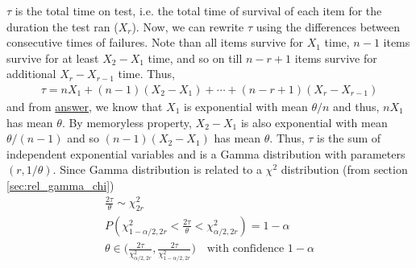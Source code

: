 \documentclass[../probability-notes.tex]{subfiles}
\begin{document}
    $\tau$ is the total time on test, i.e. the total time of survival of each item for the duration the test ran ($X_{r}$). Now, we can rewrite $\tau$ using the differences between consecutive times of failures. Note than all items survive for $X_{1}$ time, $n-1$ items survive for at least $X_{2} - X_{1}$ time, and so on till $n-r+1$ items survive for additional $X_{r} - X_{r-1}$ time. Thus,
    \begin{align*}
        \tau = nX_{1} + (n-1)(X_{2} - X_{1}) + \cdots + (n-r+1)(X_{r} - X_{r-1})
    \end{align*}
    and from \hyperlink{q_minexp}{answer}, we know that $X_{1}$ is exponential with mean $\theta/n$ and thus, $nX_{1}$ has mean $\theta$. By memoryless property, $X_{2} - X_{1}$ is also exponential with mean $\theta/(n-1)$ and so $(n-1)(X_{2} - X_{1})$ has mean $\theta$. Thus, $\tau$ is the sum of independent exponential variables and is a Gamma distribution with parameters $(r, 1/\theta)$. Since Gamma distribution is related to a $\chi^{2}$ distribution (from section \ref{sec:rel_gamma_chi})
    \begin{gather*}
        \frac{2\tau}{\theta} \sim \chi_{2r}^{2}\\
        P(\chi_{1-\alpha/2, 2r}^{2} < \frac{2\tau}{\theta} < \chi_{\alpha/2, 2r}^{2}) = 1-\alpha\\
        \theta \in \bigg(\frac{2\tau}{\chi_{\alpha/2, 2r}^{2}}, \frac{2\tau}{\chi_{1-\alpha/2, 2r}^{2}} \bigg) \quad \text{with confidence $1-\alpha$}
    \end{gather*}
\end{document}
